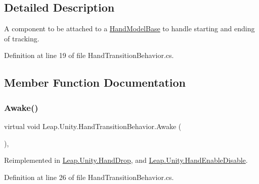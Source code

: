 \subsection{Detailed Description}
A component to be attached to a \mbox{\hyperlink{class_leap_1_1_unity_1_1_hand_model_base}{Hand\+Model\+Base}} to handle starting and ending of tracking. 



Definition at line 19 of file Hand\+Transition\+Behavior.\+cs.



\subsection{Member Function Documentation}
\mbox{\label{class_leap_1_1_unity_1_1_hand_transition_behavior_ab9676a64c8b2ed72b1dd440c1f690c58}} 
\subsubsection{\texorpdfstring{Awake()}{Awake()}}
{\footnotesize\ttfamily virtual void Leap.\+Unity.\+Hand\+Transition\+Behavior.\+Awake (\begin{DoxyParamCaption}{ }\end{DoxyParamCaption})\hspace{0.3cm}{\ttfamily [protected]}, {\ttfamily [virtual]}}



Reimplemented in \mbox{\hyperlink{class_leap_1_1_unity_1_1_hand_drop_abda506fc6c05f924aa38e0011e26ffb9}{Leap.\+Unity.\+Hand\+Drop}}, and \mbox{\hyperlink{class_leap_1_1_unity_1_1_hand_enable_disable_a3157ccde5c9e1998eb3a6788c98cca71}{Leap.\+Unity.\+Hand\+Enable\+Disable}}.



Definition at line 26 of file Hand\+Transition\+Behavior.\+cs.

\mbox{\label{class_leap_1_1_unity_1_1_hand_transition_behavior_ab8668f229af94623ad378f456ae75326}} 
